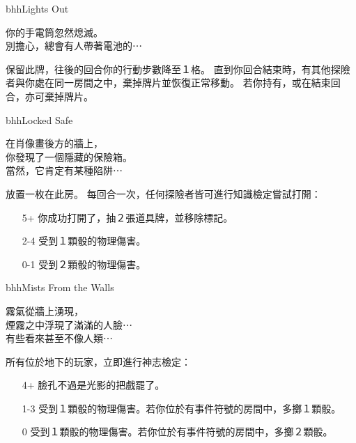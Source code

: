 \begin{EventCard}{bhh}{Lights Out}
  \begin{CardStory}
    你的手電筒忽然熄滅。\\
    別擔心，總會有人帶著電池的⋯
  \end{CardStory}
  保留此牌，往後的回合你的行動步數降至１格。\smallbreak
  直到你回合結束時，有其他探險者與你處在同一房間之中，棄掉牌片並恢復正常移動。\smallbreak
  若你持有，或在結束回合，亦可棄掉牌片。\smallbreak
\end{EventCard}%
\linebreak[0]%
\begin{EventCard}{bhh}{Locked Safe}
  \begin{CardStory}
    在肖像畫後方的牆上，\\
    你發現了一個隱藏的保險箱。\\
    當然，它肯定有某種陷阱⋯
  \end{CardStory}
  放置一枚在此房。\smallbreak
  每回合一次，任何探險者皆可進行知識檢定嘗試打開：
  \begin{itemize}
    \item[5+] 你成功打開了，抽２張道具牌，並移除標記。
    \item[2-4] 受到１顆骰的物理傷害。
    \item[0-1] 受到２顆骰的物理傷害。
  \end{itemize}
\end{EventCard}%
\linebreak[0]%
\begin{EventCard}{bhh}{Mists From the Walls}
  \begin{CardStory}
    霧氣從牆上湧現，\\
    煙霧之中浮現了滿滿的人臉⋯\\
    有些看來甚至不像人類⋯
  \end{CardStory}
  所有位於地下的玩家，立即進行神志檢定：
  \begin{itemize}
    \item[4+] 臉孔不過是光影的把戲罷了。
    \item[1-3] 受到１顆骰的物理傷害。若你位於有事件符號的房間中，多擲１顆骰。
    \item[0] 受到１顆骰的物理傷害。若你位於有事件符號的房間中，多擲２顆骰。
  \end{itemize}
\end{EventCard}%
\linebreak[0]%
